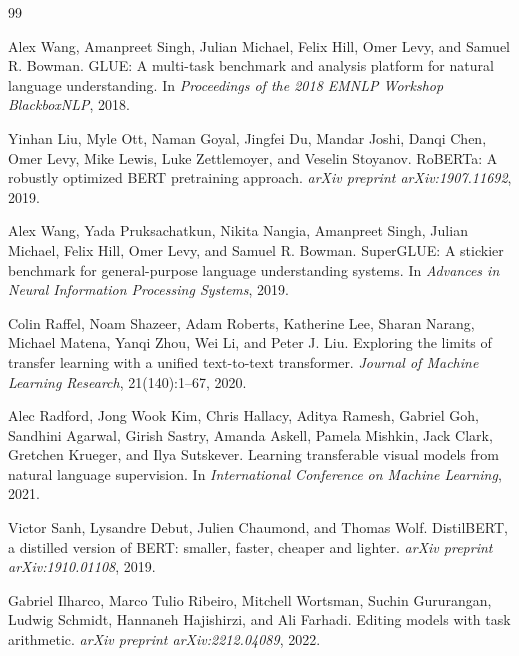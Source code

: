 \documentclass[11pt]{article}
\begin{document}
\begin{thebibliography}{99}

Alex Wang, Amanpreet Singh, Julian Michael, Felix Hill, Omer Levy, and Samuel R. Bowman.
\newblock GLUE: A multi-task benchmark and analysis platform for natural language understanding.
\newblock In \emph{Proceedings of the 2018 EMNLP Workshop BlackboxNLP}, 2018.

Yinhan Liu, Myle Ott, Naman Goyal, Jingfei Du, Mandar Joshi, Danqi Chen, Omer Levy, Mike Lewis, Luke Zettlemoyer, and Veselin Stoyanov.
\newblock RoBERTa: A robustly optimized BERT pretraining approach.
\newblock \emph{arXiv preprint arXiv:1907.11692}, 2019.

Alex Wang, Yada Pruksachatkun, Nikita Nangia, Amanpreet Singh, Julian Michael, Felix Hill, Omer Levy, and Samuel R. Bowman.
\newblock SuperGLUE: A stickier benchmark for general-purpose language understanding systems.
\newblock In \emph{Advances in Neural Information Processing Systems}, 2019.

Colin Raffel, Noam Shazeer, Adam Roberts, Katherine Lee, Sharan Narang, Michael Matena, Yanqi Zhou, Wei Li, and Peter J. Liu.
\newblock Exploring the limits of transfer learning with a unified text-to-text transformer.
\newblock \emph{Journal of Machine Learning Research}, 21(140):1--67, 2020.

Alec Radford, Jong Wook Kim, Chris Hallacy, Aditya Ramesh, Gabriel Goh, Sandhini Agarwal, Girish Sastry, Amanda Askell, Pamela Mishkin, Jack Clark, Gretchen Krueger, and Ilya Sutskever.
\newblock Learning transferable visual models from natural language supervision.
\newblock In \emph{International Conference on Machine Learning}, 2021.


Victor Sanh, Lysandre Debut, Julien Chaumond, and Thomas Wolf.
\newblock DistilBERT, a distilled version of BERT: smaller, faster, cheaper and lighter.
\newblock \emph{arXiv preprint arXiv:1910.01108}, 2019.

Gabriel Ilharco, Marco Tulio Ribeiro, Mitchell Wortsman, Suchin Gururangan, Ludwig Schmidt, Hannaneh Hajishirzi, and Ali Farhadi.
\newblock Editing models with task arithmetic.
\newblock \emph{arXiv preprint arXiv:2212.04089}, 2022.


\end{thebibliography}
\end{document}
